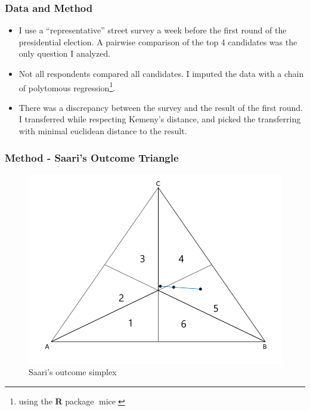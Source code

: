 \documentclass{beamer}
\begin{document}
\begin{frame}
  \frametitle{Data and Method }
  \begin{itemize}
    \item I use a ``representative'' street survey a week before the first round of the presidential election. A pairwise comparison of the top 4 candidates was the only question I analyzed.
    \item Not all respondents compared all candidates. I imputed the data with a chain of polytomous regression\footnote{ using the \textbf{\textsf{R}} package
      \(\operatorname{mice}\)}.
    \item There was a discrepancy between the survey and the result of the first round. I transferred while respecting Kemeny's distance, and picked the transferring with minimal euclidean distance to the result.
  \end{itemize}
\end{frame}

\begin{frame}
  \frametitle{Method - Saari's Outcome Triangle}
\begin{figure}[H] \centering \includegraphics[width=\textwidth]{../images/simpletriangle.png}
 \caption{Saari's outcome simplex}
 \label{fig:saari_nurmi}
\end{figure}
\end{frame}
\end{document}
